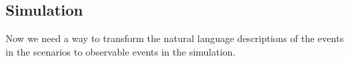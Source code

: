 \documentclass[11pt]{article}
\begin{document}




\subsection{Simulation}

Now we need a way to transform the natural language descriptions of the events in the scenarios to observable events in the simulation.
\end{document}
